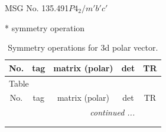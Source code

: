 \documentclass[fleqn,8pt]{jsarticle}
\begin{document}
\setcounter{MaxMatrixCols}{32}

\renewcommand{\tablename}{Table~}
\renewcommand{\figurename}{Figure~}
\begin{center}
\LARGE
MSG No. 135.491\quad$P4_{2}/m'b'c'$
\end{center}
* symmetry operation
\renewcommand{\arraystretch}{1.3}
\begin{longtable}{ccccc}
\caption{Symmetry operations for 3d polar vector.}
 \\
 \hline \hline
No. & tag & matrix (polar) & det & TR \\ \hline \endfirsthead

\multicolumn{4}{l}{\tablename\ \thetable{}} \\
 \hline \hline
No. & tag & matrix (polar) & det & TR \\ \hline \endhead

 \hline \hline
\multicolumn{4}{r}{\footnotesize\it continued ...} \\ \endfoot

 \hline \hline
\multicolumn{4}{r}{} \\ \endlastfoot


\end{longtable}
\end{document}
